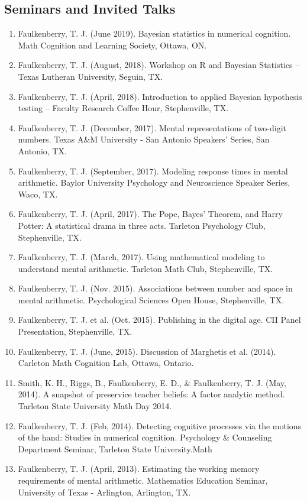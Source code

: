 \documentclass[article,10pt]{article}
\begin{document}
\subsection*{Seminars and Invited Talks}
\label{sec:org43e765a}
\begin{enumerate}
\item Faulkenberry, T. J. (June 2019). Bayesian statistics in numerical cognition. Math Cognition and Learning Society, Ottawa, ON.
\item Faulkenberry, T. J. (August, 2018). Workshop on R and Bayesian Statistics -- Texas Lutheran University, Seguin, TX.
\item Faulkenberry, T. J. (April, 2018). Introduction to applied Bayesian hypothesis testing -- Faculty Research Coffee Hour, Stephenville, TX.
\item Faulkenberry, T. J. (December, 2017). Mental representations of two-digit numbers. Texas A\&M University - San Antonio Speakers' Series, San Antonio, TX.
\item Faulkenberry, T. J. (September, 2017). Modeling response times in mental arithmetic. Baylor University Psychology and Neuroscience Speaker Series, Waco, TX.
\item Faulkenberry, T. J. (April, 2017). The Pope, Bayes' Theorem, and Harry Potter: A statistical drama in three acts.  Tarleton Psychology Club, Stephenville, TX.
\item Faulkenberry, T. J. (March, 2017). Using mathematical modeling to understand mental arithmetic. Tarleton Math Club, Stephenville, TX.
\item Faulkenberry, T. J. (Nov. 2015). Associations between number and space in mental arithmetic.  Psychological Sciences Open House, Stephenville, TX.
\item Faulkenberry, T. J. et al. (Oct. 2015). Publishing in the digital age.  CII Panel Presentation, Stephenville, TX.
\item Faulkenberry, T. J. (June, 2015). Discussion of Marghetis et al. (2014). Carleton Math Cognition Lab, Ottawa, Ontario.
\item Smith, K. H., Riggs, B., Faulkenberry, E. D., \& Faulkenberry, T. J. (May, 2014). A snapshot of preservice teacher beliefs: A factor analytic method. Tarleton State University Math Day 2014.
\item Faulkenberry, T. J. (Feb, 2014). Detecting cognitive processes via the motions of the hand: Studies in numerical cognition.  Psychology \& Counseling Department Seminar, Tarleton State University.Math
\item Faulkenberry, T. J. (April, 2013). Estimating the working memory requirements of mental arithmetic. Mathematics Education Seminar, University of Texas - Arlington, Arlington, TX.

\end{enumerate}
\end{document}
